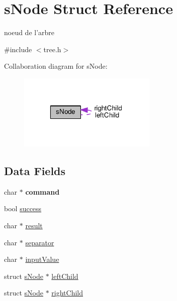\hypertarget{structsNode}{\section{s\-Node Struct Reference}
\label{structsNode}
}


noeud de l'arbre  




{\ttfamily \#include $<$tree.\-h$>$}



Collaboration diagram for s\-Node\-:\nopagebreak
\begin{figure}[H]
\begin{center}
\leavevmode
\includegraphics[width=187pt]{structsNode__coll__graph}
\end{center}
\end{figure}
\subsection*{Data Fields}
\begin{DoxyCompactItemize}
\item 
\hypertarget{structsNode_abc2af095ceb67883012bdae97f4c4537}{char $\ast$ {\bfseries command}}\label{structsNode_abc2af095ceb67883012bdae97f4c4537}

\item 
bool \hyperlink{structsNode_ad3ce64c185ce2fb0da1625cc6bce9803}{success}
\item 
char $\ast$ \hyperlink{structsNode_af404972110c1a3225dd689b03a931b36}{result}
\item 
char $\ast$ \hyperlink{structsNode_a114d95f7bc7d2ba888a7b297703d73dd}{separator}
\item 
char $\ast$ \hyperlink{structsNode_acaa42ae913310f65b9d08a4cecb3d40f}{input\-Value}
\item 
struct \hyperlink{structsNode}{s\-Node} $\ast$ \hyperlink{structsNode_abf2b6d71454df07a766b315346375dbd}{left\-Child}
\item 
struct \hyperlink{structsNode}{s\-Node} $\ast$ \hyperlink{structsNode_ad922ff3aa8dfeea7ca810d6524799126}{right\-Child}
\end{DoxyCompactItemize}


